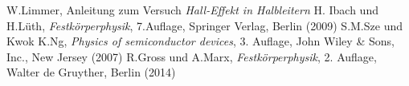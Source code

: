 \documentclass[a4paper, parskip=half, 12pt]{scrartcl}
\begin{document}





\begin{thebibliography}{10}
 W.Limmer, Anleitung zum Versuch \emph{Hall-Effekt in Halbleitern}
 H. Ibach und H.Lüth, \emph{Festkörperphysik}, 7.Auflage, Springer Verlag, Berlin (2009)
 S.M.Sze und Kwok K.Ng, \emph{Physics of semiconductor devices}, 3. Auflage, John Wiley \& Sons, Inc., New Jersey (2007)
 R.Gross und A.Marx, \emph{Festkörperphysik}, 2. Auflage, Walter de Gruyther, Berlin (2014)
\end{thebibliography}
\end{document}
